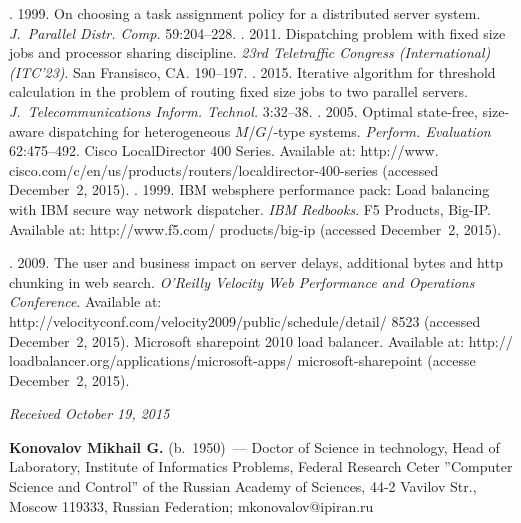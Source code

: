 \begin{multicols}{2}
{{\begin{thebibliography}{99}
    . 1999. On choosing a task 
assignment policy for a distributed server system. \textit{J.~Parallel  Distr. Comp.} 
59:204--228.
    . 2011. 
Dispatching problem with fixed size jobs and processor sharing discipline. \textit{23rd 
Teletraffic Congress (International) (ITC'23)}. San Fransisco, CA. 190--197.
    . 2015. Iterative algorithm for threshold calculation 
in the problem of routing fixed size jobs to two parallel servers. \textit{J.~Telecommunications  
Inform. Technol.} 3:32--38.
    . 2005. Optimal state-free, size-aware 
dispatching for heterogeneous $M$/$G$/-type systems. \textit{Perform. Evaluation} 62:475--492.
    Cisco LocalDirector 400 Series. Available at: {\sf 
http://www. cisco.com/c/en/us/products/routers/localdirector-400-series}
(accessed December~2, 2015). 
    . 1999. IBM websphere performance pack: Load 
balancing with IBM secure way network dispatcher. \textit{IBM Redbooks}.
    F5 Products, Big-IP. Available at: {\sf http://www.f5.com/ products/big-ip}
    (accessed December~2, 2015).
   
    . 2009. The user and business impact on server delays, 
additional bytes and http chunking in web search. \textit{O'Reilly Velocity Web 
Performance and Operations Conference}. Available at:
{\sf 
http://\linebreak velocityconf.com/velocity2009/public/schedule/detail/ 8523}
(accessed December~2, 2015).
    Microsoft sharepoint 2010 load balancer. Available at: {\sf 
http:// loadbalancer.org/applications/microsoft-apps/ microsoft-sharepoint}
(accesse December~2, 2015). 
    \end{thebibliography}

 }
 }

\end{multicols}

\vspace*{-3pt}

\hfill{\small\textit{Received October 19, 2015}}
    
    \Contr
    
    \noindent
    \textbf{Konovalov Mikhail G.} (b.\ 1950)~--- Doctor of Science in technology, 
    Head of Laboratory, Institute of Informatics Problems, Federal Research Ceter 
    ''Computer Science and Control'' of the Russian Academy of Sciences, 44-2 Vavilov 
    Str., Moscow 119333, Russian Federation; mkonovalov@ipiran.ru
    
